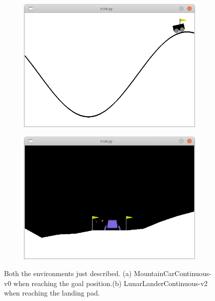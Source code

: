 \documentclass[11pt]{article}
\begin{document}
\begin{figure}[h!]
        \centering
        \begin{subfigure}[b]{0.4\linewidth}
                \includegraphics[width=\linewidth]{mountain_screen}
                \caption{}
        \end{subfigure}
        \begin{subfigure}[b]{0.4\linewidth}
                \includegraphics[width=\linewidth]{lunar_screen}
                \caption{}
        \end{subfigure}

        \caption{ Both the environments just described. (a) MountainCarContinuous-v0 when reaching the goal position.(b) LunarLanderContinuous-v2 when reaching the landing pad.}
        \label{fig:screens}
\end{figure}
\end{document}
